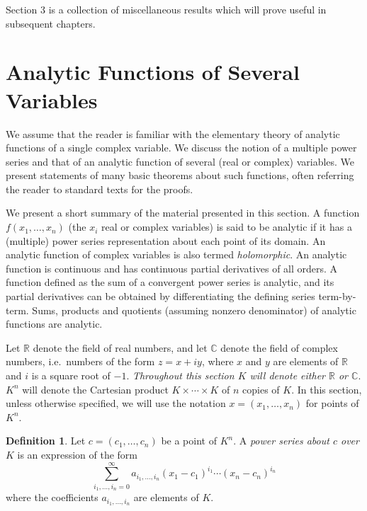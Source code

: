 \documentclass[11pt]{article}
\theoremstyle{plain}
\theoremstyle{definition}
\newtheorem*{definition}{Definition}
\newcommand{\R}{\mathbb{R}}
\newcommand{\C}{\mathbb{C}}
\begin{document}
Section 3 is a collection of miscellaneous results which will prove useful
in subsequent chapters.

\section{Analytic Functions of Several Variables}

We assume that the reader is familiar with the elementary theory of
analytic functions of a single complex variable. We discuss the notion of
a multiple power series and that of an analytic function of several (real
or complex) variables. We present statements of many basic theorems about
such functions, often referring the reader to standard texts for the
proofs.

We present a short summary of the material presented in this section. A
function $f(x_1,\ldots,x_n)$ (the $x_i$ real or complex variables) is said
to be analytic if it has a (multiple) power series representation about
each point of its domain. An analytic function of complex variables is
also termed \emph{holomorphic}. An analytic function is continuous and
has continuous partial derivatives of all orders. A function defined as
the sum of a convergent power series is analytic, and its partial
derivatives can be obtained by differentiating the defining series
term-by-term. Sums, products and quotients (assuming nonzero denominator)
of analytic functions are analytic.

Let $\R$ denote the field of real numbers, and let $\C$ denote the field
of complex numbers, i.e.\ numbers of the form $z = x + iy$, where $x$ and
$y$ are elements of $\R$ and $i$ is a square root of $-1$. \emph{Throughout
this section $K$ will denote either $\R$ or $\C$}. $K^n$ will denote the
Cartesian product $K \times \cdots \times K$ of $n$ copies of $K$. In this
section, unless otherwise specified, we will use the notation
$x = (x_1, \ldots, x_n)$ for points of $K^n$.

\begin{definition}
Let $c = (c_1, \ldots, c_n)$ be a point of $K^n$. A \emph{power series
about $c$ over $K$} is an expression of the form
\begin{equation}
\sum_{i_1, \ldots, i_n = 0}^{\infty}
a_{i_1, \ldots, i_n} (x_1 - c_1)^{i_1} \cdots (x_n - c_n)^{i_n}
\tag{2.1.1}
\end{equation}
where the coefficients $a_{i_1, \ldots, i_n}$ are elements of $K$.
\end{definition}
\end{document}
